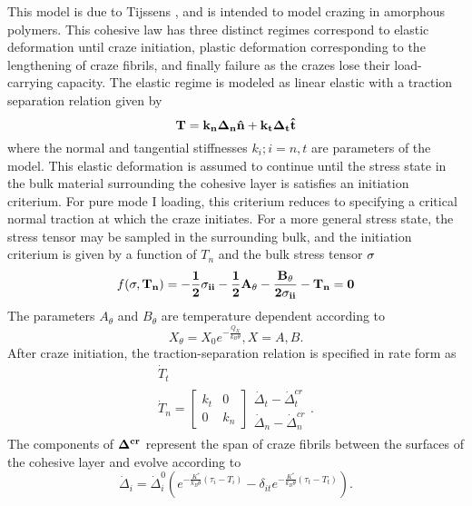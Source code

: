 This model is due to Tijssens \etal \cite{Tijssens2001},  
and is intended to model
crazing in amorphous polymers. This cohesive law has three distinct regimes
correspond to elastic deformation until craze initiation, plastic
deformation corresponding to the lengthening of craze fibrils, and finally
failure as the crazes lose their load-carrying capacity. The elastic
regime is modeled as linear elastic with a traction separation relation
given by 
\begin{equation}
\bf{T} = k_n \Delta_n \hat{\bf{n}} + k_t \Delta_t \hat{\bf{t}}
\end{equation}
where the normal and tangential stiffnesses $k_i; i = n, t$ are 
parameters of the model. This elastic deformation is assumed to continue
until the stress state in the bulk material surrounding the cohesive
layer is satisfies an initiation criterium. For pure mode I loading,
this criterium reduces to specifying a critical normal traction at
which the craze initiates. For a more general stress state, the stress
tensor may be sampled in the surrounding bulk, and the initiation criterium
is given by a function of $T_n$ and the bulk stress tensor $\bf{\sigma}$
\begin{equation}
f(\bf{\sigma},T_n) = -\frac{1}{2} \sigma_{ii} - \frac{1}{2} A_\theta - \frac{B_\theta}{2 \sigma_{ii}} - T_n = 0
\end{equation}
The parameters $A_\theta$ and  $B_\theta$ are temperature dependent 
according to
\begin{equation}
X_\theta = X_0 e^{-\frac{Q_X}{k_B \theta}}, X = A, B.
\end{equation}
After craze initiation, the traction-separation relation is specified
in rate form as 
\begin{equation}
\begin{matrix}
\dot{T}_t\\\dot{T}_n = 
\begin{bmatrix}
k_t & 0  \\
0 & k_n
\end{bmatrix}
\begin{matrix}
\dot{\Delta}_t - \dot{\Delta}_t^{cr} \\
\dot{\Delta}_n - \dot{\Delta}_n^{cr}
\end{matrix}.
\end{matrix}
\end{equation}
The components of $\bf{\Delta}^{cr}$ represent the span of craze fibrils between
the surfaces of the cohesive layer and evolve according to 
\begin{equation}
\dot{\Delta}_i = \dot{\Delta}_i^0 (e^{-\frac{K^*}{k_B \theta} 
(\tau_i-T_i)}-\delta_{it} e^{-\frac{K^*}{k_B \theta} (\tau_t-T_t)}).
\end{equation}
